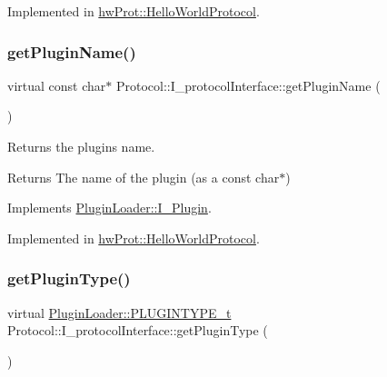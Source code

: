 Implemented in \mbox{\hyperlink{classhwProt_1_1HelloWorldProtocol_a2af49345e67a98301465ffb2743b6177}{hw\+Prot\+::\+Hello\+World\+Protocol}}.

\mbox{\label{classProtocol_1_1I__protocolInterface_a53e95b7d9ea9ad8ee179c2663511ce20}} 
\subsubsection{\texorpdfstring{getPluginName()}{getPluginName()}}
{\footnotesize\ttfamily virtual const char$\ast$ Protocol\+::\+I\+\_\+protocol\+Interface\+::get\+Plugin\+Name (\begin{DoxyParamCaption}{ }\end{DoxyParamCaption})\hspace{0.3cm}{\ttfamily [pure virtual]}}



Returns the plugins name. 

\begin{DoxyReturn}{Returns}
The name of the plugin (as a const char$\ast$) 
\end{DoxyReturn}


Implements \mbox{\hyperlink{classPluginLoader_1_1I__Plugin_a4c45255b16398fff512940a5e5b8322a}{Plugin\+Loader\+::\+I\+\_\+\+Plugin}}.



Implemented in \mbox{\hyperlink{classhwProt_1_1HelloWorldProtocol_acca6465073e5919a7a74b8f74e869e8e}{hw\+Prot\+::\+Hello\+World\+Protocol}}.

\mbox{\label{classProtocol_1_1I__protocolInterface_aaa1010c6c48d6a4a99998ae383f2172c}} 
\subsubsection{\texorpdfstring{getPluginType()}{getPluginType()}}
{\footnotesize\ttfamily virtual \mbox{\hyperlink{namespacePluginLoader_a7b1358e9577b47b5d4b16231a5a81699}{Plugin\+Loader\+::\+P\+L\+U\+G\+I\+N\+T\+Y\+P\+E\+\_\+t}} Protocol\+::\+I\+\_\+protocol\+Interface\+::get\+Plugin\+Type (\begin{DoxyParamCaption}{ }\end{DoxyParamCaption})\hspace{0.3cm}{\ttfamily [pure virtual]}}



